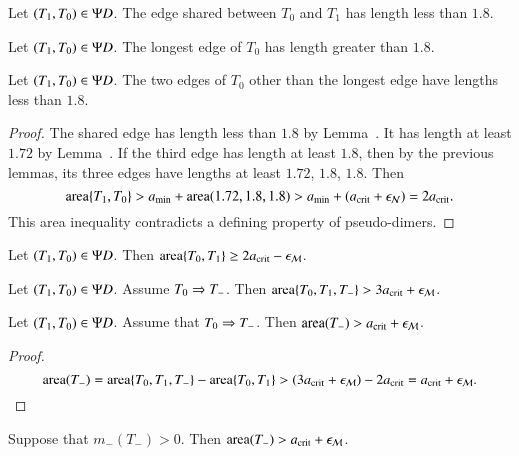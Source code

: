 \begin{lemma}  
Let $(T_1,T_0)\in \Psi D$.  The edge shared between
$T_0$ and $T_1$ has length less than $1.8$. 
\end{lemma}

\begin{lemma} 
Let $(T_1,T_0)\in \Psi D$.  The longest edge of $T_0$
has length greater than $1.8$.
\end{lemma}

\begin{lemma}  
  Let $(T_1,T_0)\in \Psi D$.  The two edges of $T_0$ other than the
  longest edge have lengths less than $1.8$.
\end{lemma}

\begin{proof}
  The shared edge has length less than $1.8$ by
  Lemma~.  It has length at least $1.72$ by
  Lemma~.  If the third edge has length at least $1.8$,
  then by the previous lemmas, its three edges have lengths at least
  $1.72$, $1.8$, $1.8$.  Then
\[
{\operatorname{area}}\{T_1,T_0\} > a_\text{min} + {\operatorname{area}}(1.72,1.8,1.8) > a_\text{min} + (a_\text{crit} + \epsilon_{\mathcal N}) = 2a_\text{crit}.
\]
This area inequality contradicts a defining property of pseudo-dimers.
\end{proof}

\begin{lemma}
Let $(T_1,T_0)\in\Psi D$.  Then ${\operatorname{area}}\{T_0,T_1\} \ge 2a_\text{crit} - \epsilon_{\mathcal M}$.
\end{lemma}

\begin{lemma}
Let $(T_1,T_0)\in\Psi D$. Assume $T_0\Rightarrow T_-$.  
Then ${\operatorname{area}}\{T_0,T_1,T_-\} > 3a_\text{crit} + \epsilon_{\mathcal M}$.
\end{lemma}

\begin{corollary} 
Let $(T_1,T_0)\in\Psi D$.  Assume that $T_0\Rightarrow T_-$.  Then
${\operatorname{area}}(T_-) > a_\text{crit}+\epsilon_{\mathcal M}$.
\end{corollary}

\begin{proof}  
\[
{\operatorname{area}}(T_-) = {\operatorname{area}}\{T_0,T_1,T_-\} - {\operatorname{area}}\{T_0,T_1\} 
> (3a_\text{crit} + \epsilon_{\mathcal M}) - 2a_\text{crit} = a_\text{crit} + \epsilon_{\mathcal M}.
\]
\end{proof}

\begin{corollary}
  Suppose that $m_-(T_-)>0$.  Then ${\operatorname{area}}(T_-) > a_\text{crit} + \epsilon_{\mathcal M}$.
\end{corollary}

